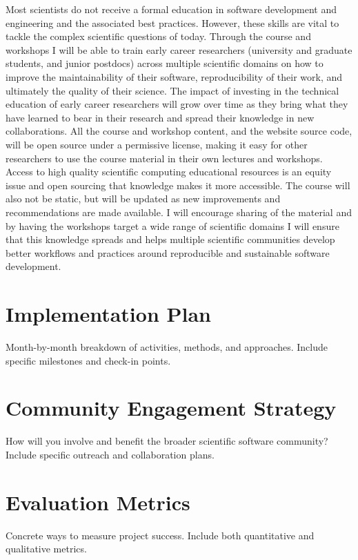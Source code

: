 \documentclass[letterpaper, 11pt]{article}
\begin{document}
Most scientists do not receive a formal education in software development and engineering and the associated best practices.
However, these skills are vital to tackle the complex scientific questions of today.
Through the course and workshops I will be able to train early career researchers (university and graduate students, and junior postdocs) across multiple scientific domains on how to improve the maintainability of their software, reproducibility of their work, and ultimately the quality of their science.
The impact of investing in the technical education of early career researchers will grow over time as they bring what they have learned to bear in their research and spread their knowledge in new collaborations.
All the course and workshop content, and the website source code, will be open source under a permissive license, making it easy for other researchers to use the course material in their own lectures and workshops.
Access to high quality scientific computing educational resources is an equity issue and open sourcing that knowledge makes it more accessible. The course will also not be static, but will be updated as new improvements and recommendations are made available.
I will encourage sharing of the material and by having the workshops target a wide range of scientific domains I will ensure that this knowledge spreads and helps multiple scientific communities develop better workflows and practices around reproducible and sustainable software development.

\section{Implementation Plan}

Month-by-month breakdown of activities, methods, and approaches.
Include specific milestones and check-in points.

\section{Community Engagement Strategy}

How will you involve and benefit the broader scientific software community?
Include specific outreach and collaboration plans.

\section{Evaluation Metrics}

Concrete ways to measure project success.
Include both quantitative and qualitative metrics.
\end{document}
